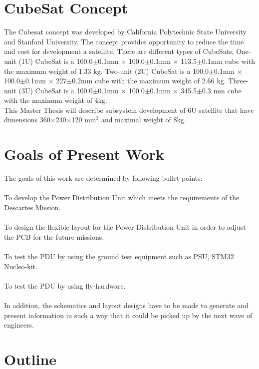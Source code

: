 \section{CubeSat Concept}
The Cubesat concept was developed by California Polytechnic State University and Stanford University. The concept provides opportunity to reduce the time and cost for development a satellite. There are different types of CubeSats, One-unit (1U) CubeSat is a 100.0$\pm$0.1mm $\times$ 100.0$\pm$0.1mm $\times$ 113.5$\pm$0.1mm cube with the maximum weight of 1.33 kg. Two-unit (2U) CubeSat is a 100.0$\pm$0.1mm $\times$ 100.0$\pm$0.1mm $\times$ 227$\pm$0.2mm cube with the maximum weight of 2.66 kg. Three-unit (3U) CubeSat is a 100.0$\pm$0.1mm $\times$ 100.0$\pm$0.1mm $\times$ 345.5$\pm$0.3 mm cube with the maximum weight of 4kg.\\

 This Master Thesis will describe subsystem development of 6U satellite that have dimensions 360$\times$240$\times$120 mm$^3$ and maximal weight of 8kg.\\ 

\section{Goals of Present Work\label{Goals}}
The goals of this work are determined by following bullet points:\\ \\
  To develop the Power Distribution Unit which meets the requirements of the Descartes Mission.\\ \\
  To design the flexible layout for the Power Distribution Unit in order to adjust the PCB for the future missions.\\ \\
 To test the PDU by using the ground test equipment such as PSU, STM32 Nucleo-kit.\\ \\
  To test the PDU by using fly-hardware.\\ \\

In addition, the schematics and layout designs have to be made to generate and present information in such a way that it could be picked up by the next wave of engineers.



\section{Outline\label{sec:outline}}

